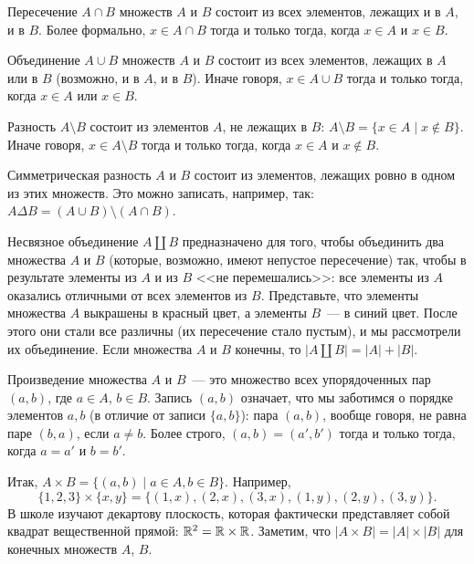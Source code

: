 Пересечение $A\cap B$ множеств $A$ и $B$ состоит из всех элементов, лежащих и в
$A$, и в $B$. Более формально, $x\in A\cap B$ тогда и только тогда,
когда $x\in A$ и $x\in B$.

Объединение $A\cup B$ множеств $A$ и $B$ состоит из всех элементов,
лежащих в $A$ или в $B$ (возможно, и в $A$, и в $B$). Иначе говоря,
$x\in A\cup B$ тогда и только тогда, когда $x\in A$ или $x\in B$.

Разность $A\setminus B$ состоит из элементов $A$, не лежащих в $B$:
$A\setminus B=\{x\in A\mid x\not\in B\}$. Иначе говоря, $x\in
A\setminus B$ тогда и только тогда, когда $x\in A$ и $x\not\in B$.

Симметрическая разность $A$ и $B$ состоит из элементов, лежащих ровно
в одном из этих множеств. Это можно записать, например, так: $A\Delta
B=(A\cup B)\setminus(A\cap B)$.

Несвязное объединение $A\coprod B$ предназначено для того, чтобы
объединить два
множества $A$ и $B$ (которые, возможно, имеют непустое пересечение)
так, чтобы в результате элементы из $A$ и из $B$ <<не
перемешались>>: все элементы из $A$ оказались отличными от всех
элементов из $B$. Представьте, что элементы множества $A$ выкрашены в
красный цвет, а элементы $B$~--- в синий цвет. После этого они стали
все различны (их пересечение стало пустым), и мы рассмотрели их
объединение. Если множества $A$ и $B$ конечны, то $|A\coprod
B|=|A|+|B|$.

Произведение множества $A$ и $B$~--- это множество всех упорядоченных
пар $(a,b)$, где $a\in A$, $b\in B$. Запись $(a,b)$ означает, что мы
заботимся о порядке элементов $a,b$ (в отличие от записи
$\{a,b\}$): пара $(a,b)$, вообще говоря, не равна паре $(b,a)$, если
$a\neq b$. Более строго, $(a,b)=(a',b')$ тогда и только тогда, когда
$a=a'$ и $b=b'$.

Итак, $A\times B=\{(a,b)\mid a\in A,b\in B\}$. Например,
$$
\{1,2,3\}\times\{x,y\}=\{(1,x),(2,x),(3,x),(1,y),(2,y),(3,y)\}.
$$
В
школе изучают декартову плоскость, которая фактически представляет
собой квадрат вещественной прямой: $\mathbb R^2=\mathbb R\times\mathbb
R$. Заметим, что $|A\times B|=|A|\times |B|$ для конечных множеств
$A$, $B$.

